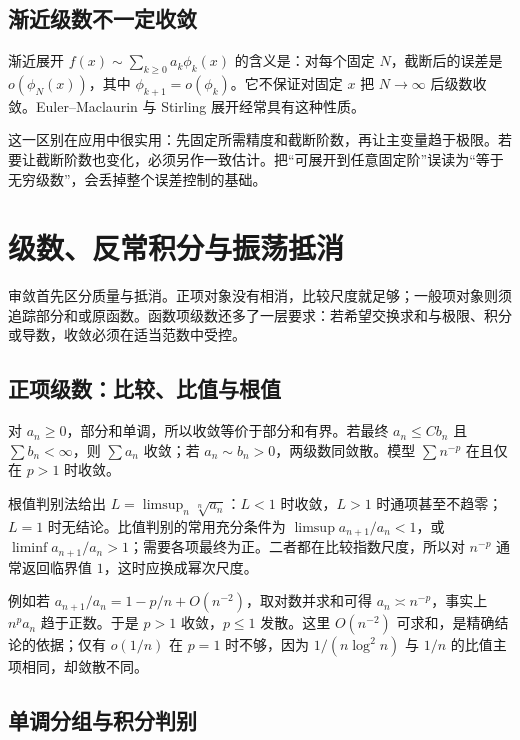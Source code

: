 \documentclass[UTF8,12pt,a4paper,fontset=fandol]{ctexart}
\begin{document}
\subsection{渐近级数不一定收敛}

\label{app:taylor-asymptotic-series}

渐近展开 $f(x)\sim\sum_{k\geq0}a_k\phi_k(x)$ 的含义是：对每个固定 $N$，截断后的误差是 $o(\phi_N(x))$，其中 $\phi_{k+1}=o(\phi_k)$。它不保证对固定 $x$ 把 $N\to\infty$ 后级数收敛。Euler--Maclaurin 与 Stirling 展开经常具有这种性质。

这一区别在应用中很实用：先固定所需精度和截断阶数，再让主变量趋于极限。若要让截断阶数也变化，必须另作一致估计。把“可展开到任意固定阶”误读为“等于无穷级数”，会丢掉整个误差控制的基础。



\section{级数、反常积分与振荡抵消}

审敛首先区分质量与抵消。正项对象没有相消，比较尺度就足够；一般项对象则须追踪部分和或原函数。函数项级数还多了一层要求：若希望交换求和与极限、积分或导数，收敛必须在适当范数中受控。

\subsection{正项级数：比较、比值与根值}

\label{app:series-positive}

对 $a_n\geq0$，部分和单调，所以收敛等价于部分和有界。若最终 $a_n\leq Cb_n$ 且 $\sum b_n<\infty$，则 $\sum a_n$ 收敛；若 $a_n\sim b_n>0$，两级数同敛散。模型 $\sum n^{-p}$ 在且仅在 $p>1$ 时收敛。

根值判别法给出 $L=\limsup_n\sqrt[n]{a_n}$：$L<1$ 时收敛，$L>1$ 时通项甚至不趋零；$L=1$ 时无结论。比值判别的常用充分条件为 $\limsup a_{n+1}/a_n<1$，或 $\liminf a_{n+1}/a_n>1$；需要各项最终为正。二者都在比较指数尺度，所以对 $n^{-p}$ 通常返回临界值 $1$，这时应换成幂次尺度。

例如若 $a_{n+1}/a_n=1-p/n+O(n^{-2})$，取对数并求和可得 $a_n\asymp n^{-p}$，事实上 $n^pa_n$ 趋于正数。于是 $p>1$ 收敛，$p\leq1$ 发散。这里 $O(n^{-2})$ 可求和，是精确结论的依据；仅有 $o(1/n)$ 在 $p=1$ 时不够，因为 $1/(n\log^2n)$ 与 $1/n$ 的比值主项相同，却敛散不同。

\subsection{单调分组与积分判别}
\end{document}
